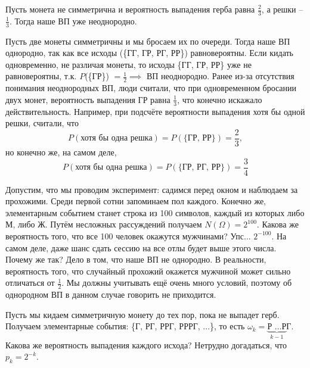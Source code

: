 \documentclass[11pt]{article}
\begin{document}
\begin{example}[П1: неоднородное ВП]
  Пусть монета не симметрична и вероятность выпадения герба 
  равна $\displaystyle \frac{2}{3}$, а решки -- 
  $\displaystyle \frac{1}{3}$. Тогда наше ВП уже неоднородно.
\end{example}

\begin{example}[П2: однородное ВП]
  Пусть две монеты симметричны и мы бросаем их по очереди. 
  Тогда наше ВП однородно, так как все исходы (\{ГГ, ГР, 
  РГ, РР\}) равновероятны. Если кидать одновременно, не 
  различая монеты, то исходы \{ГГ, ГР, РР\} уже не 
  равновероятны, т.к. $P$(\{ГР\}) $= \displaystyle 
  \frac{1}{2} \implies$ ВП неоднородно. Ранее из-за 
  отсутствия понимания неоднородных ВП, люди считали, что
  при одновременном бросании двух монет, вероятность 
  выпадения ГР равна $\displaystyle \frac{1}{3}$, что конечно 
  искажало действительность. Например, при подсчёте 
  вероятности выпадения хотя бы одной решки, считали, что
  \[P(\text{хотя бы одна решка}) = P(\text{\{ГР, РР\}}) = \frac{2}{3},\]
  но конечно же, на самом деле, 
  \[P(\text{хотя бы одна решка}) = P(\text{\{ГР, РГ, РР\}}) = \frac{3}{4}\]
\end{example}

\begin{example}
  Допустим, что мы проводим эксперимент: садимся перед 
  окном и наблюдаем за прохожими. Среди первой сотни 
  запоминаем пол каждого. Конечно же, элементарным событием 
  станет строка из 100 символов, каждый из которых либо М, 
  либо Ж. Путём несложных рассуждений получаем $N(\Omega) = 
  2^{100}$. Какова же вероятность того, что все 100 человек 
  окажутся мужчинами? Упс... $2^{-100}$. На самом деле, даже
  шанс сдать сессию на все отлы будет выше этого числа. 
  Почему же так? Дело в том, что наше ВП не однородно. В реальности,
  вероятность того, что случайный прохожий окажется мужчиной 
  может сильно отличаться от $\displaystyle \frac{1}{2}$. Мы 
  должны учитывать ещё очень много условий, поэтому об 
  однородном ВП в данном случае говорить не приходится.
\end{example}

\begin{example}
  Пусть мы кидаем симметричную монету до тех пор, пока не 
  выпадет герб. Получаем элементарные события: \{Г, РГ, 
  РРГ, РРРГ, ...\}, то есть $\omega_k = 
  \underbrace{\text{Р \ldots Р}}_{k-1}$Г. Какова же 
  вероятность выпадения каждого исхода? Нетрудно 
  догадаться, что $p_k = 2^{-k}$.  
\end{example}
\end{document}
